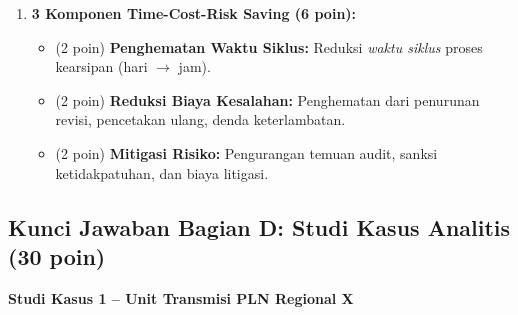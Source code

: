 \documentclass[12pt,a4paper]{report}
\begin{document}
\begin{enumerate}[leftmargin=*, itemsep=0.4cm]
\item \textbf{3 Komponen Time-Cost-Risk Saving (6 poin):}
\begin{itemize}[nosep]
    \item (2 poin) \textbf{Penghematan Waktu Siklus:} Reduksi \textit{waktu siklus} proses kearsipan (hari $\rightarrow$ jam).
    \item (2 poin) \textbf{Reduksi Biaya Kesalahan:} Penghematan dari penurunan revisi, pencetakan ulang, denda keterlambatan.
    \item (2 poin) \textbf{Mitigasi Risiko:} Pengurangan temuan audit, sanksi ketidakpatuhan, dan biaya litigasi.
\end{itemize}

\end{enumerate}

\vspace{0.5cm}

\newpage
\subsection{Kunci Jawaban Bagian D: Studi Kasus Analitis (30 poin)}

\textbf{Studi Kasus 1 -- Unit Transmisi PLN Regional X}
\end{document}
